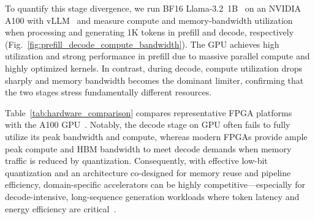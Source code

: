 \documentclass[conference]{IEEEtran}
\begin{document}
To quantify this stage divergence, we run BF16 Llama-3.2~1B~\cite{hf_llama_3_2_1b_access} on an NVIDIA A100 with vLLM~\cite{kwon2023vllm} and measure compute and memory-bandwidth utilization when processing and generating 1K tokens in prefill and decode, respectively (Fig.~\ref{fig:prefill_decode_compute_bandwidth}). The GPU achieves high utilization and strong performance in prefill due to massive parallel compute and highly optimized kernels. In contrast, during decode, compute utilization drops sharply and memory bandwidth becomes the dominant limiter, confirming that the two stages stress fundamentally different resources.

Table~\ref{tab:hardware_comparison} compares representative FPGA platforms~\cite{amd_u280_ds, amd_versal_v80_ds} with the A100 GPU~\cite{nvidia_a100_80gb_pcie_ds}. Notably, the decode stage on GPU often fails to fully utilize its peak bandwidth and compute, whereas modern FPGAs provide ample peak compute and HBM bandwidth to meet decode demands when memory traffic is reduced by quantization. Consequently, with effective low-bit quantization and an architecture co-designed for memory reuse and pipeline efficiency, domain-specific accelerators can be highly competitive—especially for decode-intensive, long-sequence generation workloads where token latency and energy efficiency are critical~\cite{chen2024understanding, joel2024survey, gomez2023confederacy}. 



\begin{table}[t]
\centering
\caption{Comparison of key hardware metrics across NVIDIA A100 GPU, AMD Alveo U280 FPGA, and Versal V80 FPGA.}
\label{tab:hardware_comparison}
\vspace{-0.2cm}
\end{table}
\end{document}
